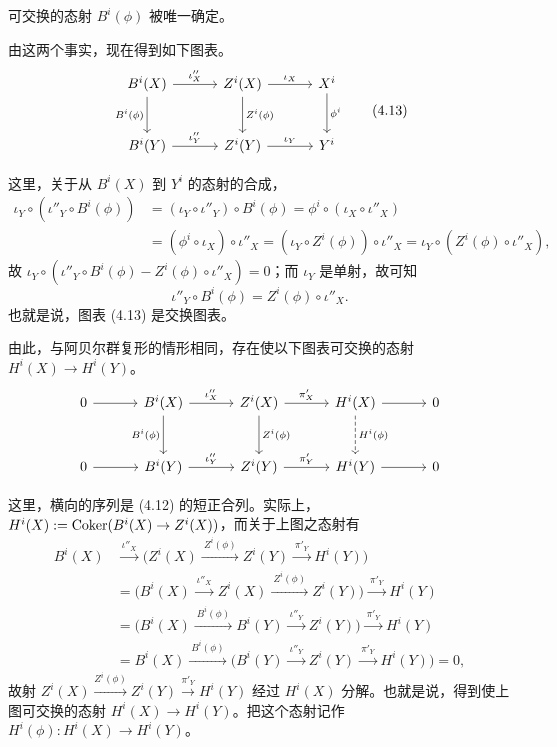 可交换的态射 $B^i(\phi)$ 被唯一确定。

由这两个事实，现在得到如下图表。
\begin{equation}
\begin{tikzcd}[row sep=2.6em, column sep=3.2em]
  B^i(X) \arrow[r,"\iota''_X"] \arrow[d,"B^i(\phi)"'] & Z^i(X) \arrow[r,"\iota_X"] \arrow[d,"Z^i(\phi)"] & X^i \arrow[d,"\phi^i"] \\
  B^i(Y) \arrow[r,"\iota''_Y"] & Z^i(Y) \arrow[r,"\iota_Y"] & Y^i
\end{tikzcd} \tag{4.13}
\end{equation}

这里，关于从 $B^i(X)$ 到 $Y^i$ 的态射的合成，
\[
\begin{aligned}
  \iota_Y\circ(\iota''_Y\circ B^i(\phi))&=(\iota_Y\circ\iota''_Y)\circ B^i(\phi)=\phi^i\circ(\iota_X\circ\iota''_X)\\
  &=(\phi^i\circ\iota_X)\circ\iota''_X=(\iota_Y\circ Z^i(\phi))\circ\iota''_X=\iota_Y\circ(Z^i(\phi)\circ\iota''_X),
\end{aligned}
\]
故 $\iota_Y\circ(\iota''_Y\circ B^i(\phi)-Z^i(\phi)\circ\iota''_X)=0$；而 $\iota_Y$ 是单射，故可知
\[ \iota''_Y\circ B^i(\phi)=Z^i(\phi)\circ\iota''_X. \]
也就是说，图表 (4.13) 是交换图表。

由此，与阿贝尔群复形的情形相同，存在使以下图表可交换的态射 $H^i(X)\to H^i(Y)$。
\[\begin{tikzcd}[row sep=2.8em, column sep=3.2em]
  0 \arrow[r] & B^i(X) \arrow[r,"\iota''_X"] \arrow[d,"B^i(\phi)"'] & Z^i(X) \arrow[r,"\pi'_X"] \arrow[d,"Z^i(\phi)"] & H^i(X) \arrow[r] \arrow[d,dashed,"H^i(\phi)"] & 0 \\
  0 \arrow[r] & B^i(Y) \arrow[r,"\iota''_Y"] & Z^i(Y) \arrow[r,"\pi'_Y"] & H^i(Y) \arrow[r] & 0
\end{tikzcd}\]

这里，横向的序列是 (4.12) 的短正合列。实际上，$H^i(X):=\operatorname{Coker}(B^i(X)\to Z^i(X))$，而关于上图之态射有
\[
\begin{aligned}
  B^i(X)&\xrightarrow{\ \iota''_X\ }\bigl(Z^i(X)\xrightarrow{\ Z^i(\phi)\ }Z^i(Y)\xrightarrow{\ \pi'_Y\ }H^i(Y)\bigr)\\
  &=\bigl(B^i(X)\xrightarrow{\ \iota''_X\ }Z^i(X)\xrightarrow{\ Z^i(\phi)\ }Z^i(Y)\bigr)\xrightarrow{\ \pi'_Y\ }H^i(Y)\\
  &=\bigl(B^i(X)\xrightarrow{\ B^i(\phi)\ }B^i(Y)\xrightarrow{\ \iota''_Y\ }Z^i(Y)\bigr)\xrightarrow{\ \pi'_Y\ }H^i(Y)\\
  &=B^i(X)\xrightarrow{\ B^i(\phi)\ }\bigl(B^i(Y)\xrightarrow{\ \iota''_Y\ }Z^i(Y)\xrightarrow{\ \pi'_Y\ }H^i(Y)\bigr)=0,
\end{aligned}
\]
故射 $Z^i(X)\xrightarrow{Z^i(\phi)}Z^i(Y)\xrightarrow{\pi'_Y}H^i(Y)$ 经过 $H^i(X)$ 分解。也就是说，得到使上图可交换的态射 $H^i(X)\to H^i(Y)$。把这个态射记作 $H^i(\phi)\colon H^i(X)\to H^i(Y)$。

